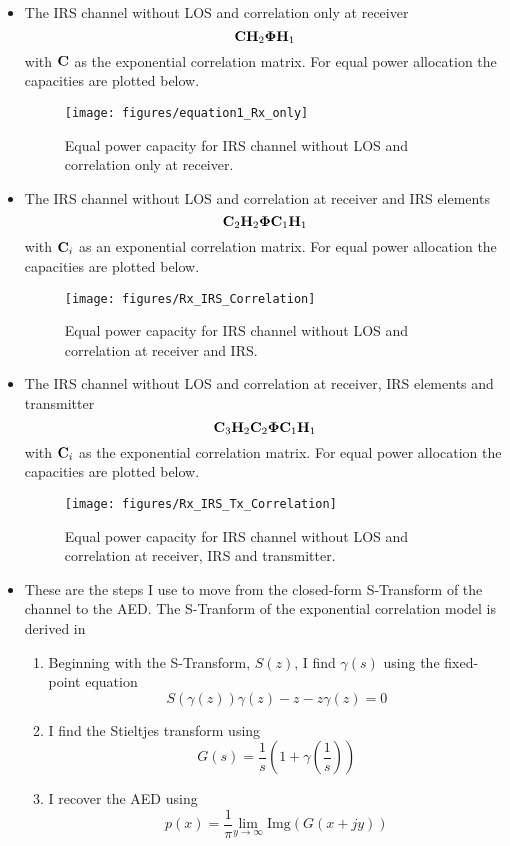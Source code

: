 \documentclass[12pt,a4paper]{report}
\begin{document}
\begin{itemize}
\item
	The IRS channel without LOS and correlation only at receiver
	\begin{equation}
	\mathbf{C}\mathbf{H}_2 \boldsymbol{\Phi}\mathbf{H}_1
	\end{equation}
	with $\mathbf{C}$ as the exponential correlation matrix. 
	For equal power allocation the capacities are plotted below. 
		\begin{figure}[H]
	\texttt{[image: figures/equation1\_Rx\_only]}
	  \caption{Equal power capacity for IRS channel without LOS and correlation only at receiver.}
	\end{figure}
\item
	The IRS channel without LOS and correlation at receiver and IRS elements
	\begin{equation}
	\mathbf{C}_2 \mathbf{H}_2\boldsymbol{\Phi}\mathbf{C}_1 \mathbf{H}_1
	\end{equation}
	with $\mathbf{C}_i$ as an exponential correlation matrix. 
	For equal power allocation the capacities are plotted below. 
		\begin{figure}[H]
	\texttt{[image: figures/Rx\_IRS\_Correlation]}
	  \caption{Equal power capacity for IRS channel without LOS and correlation at receiver and IRS.}
	\end{figure}	
	
\item
	The IRS channel without LOS and correlation at receiver, IRS elements and transmitter
	\begin{equation}
	\mathbf{C}_3 \mathbf{H}_2\mathbf{C}_2 \boldsymbol{\Phi}\mathbf{C}_1 \mathbf{H}_1
	\end{equation}
	with $\mathbf{C}_i$ as the exponential correlation matrix. 
	For equal power allocation the capacities are plotted below. 
		\begin{figure}[H]
	\texttt{[image: figures/Rx\_IRS\_Tx\_Correlation]}
	  \caption{Equal power capacity for IRS channel without LOS and correlation at receiver, IRS and transmitter.}
	\end{figure}	
	
\item
	These are the steps I use to move from the closed-form S-Transform of the channel to the AED.
	The S-Tranform of the exponential correlation model is derived in \cite{skupch2005free}
	\begin{enumerate}
	\item
		Beginning with the S-Transform, $S(z)$, I find $\gamma(s)$ using the fixed-point equation
		\begin{equation}
			S(\gamma(z))\gamma(z) - z - z\gamma(z) = 0 
		\end{equation}
	\item
		I find the Stieltjes transform using
		\begin{equation}
			G(s) = \frac{1}{s} (1+\gamma(\frac{1}{s}))
		\end{equation}			
	\item 
		I recover the AED using 
\begin{equation}
p(x) = \frac{1}{\pi} \underset{y \rightarrow \infty}{\text{lim}} \; \text{Img}(G(x+jy))
\end{equation}
	\end{enumerate}


\end{itemize}
\end{document}
